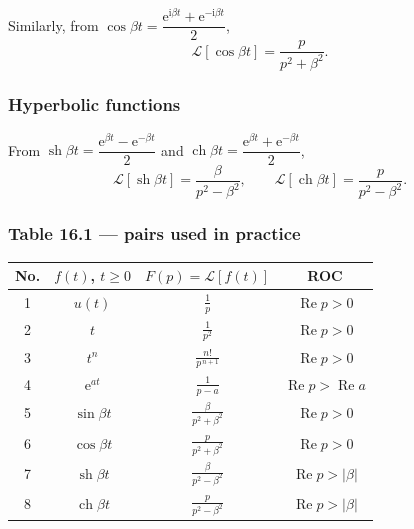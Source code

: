 \documentclass[11pt,a4paper]{article}
\theoremstyle{definition}
\theoremstyle{plain}
\begin{document}
Similarly, from
$\cos\beta t=\dfrac{\mathrm{e}^{\mathrm{i}\beta t}+\mathrm{e}^{-\mathrm{i}\beta t}}{2}$,
\begin{equation}
\mathcal{L}\left[\cos\beta t\right]=\frac{p}{p^{2}+\beta^{2}} . \tag{16.15}
\end{equation}

\subsubsection{Hyperbolic functions}

From
$\operatorname{sh}\beta t=\dfrac{\mathrm{e}^{\beta t}-\mathrm{e}^{-\beta t}}{2}$ and
$\operatorname{ch}\beta t=\dfrac{\mathrm{e}^{\beta t}+\mathrm{e}^{-\beta t}}{2}$,
\begin{equation}
\mathcal{L}\left[\operatorname{sh}\beta t\right]=\frac{\beta}{p^{2}-\beta^{2}},\qquad
\mathcal{L}\left[\operatorname{ch}\beta t\right]=\frac{p}{p^{2}-\beta^{2}} . \tag{16.16}
\end{equation}

\subsubsection{Table 16.1 --- pairs used in practice}

\begin{center}
\renewcommand{\arraystretch}{1.4}
\begin{tabular}{|c|c|c|c|}
\hline
No. & $f(t)$, $t\ge 0$ & $F(p)=\mathcal{L}[f(t)]$ & ROC \\ \hline
1 & $u(t)$ & $\frac{1}{p}$ & $\operatorname{Re}p>0$ \\ \hline
2 & $t$ & $\frac{1}{p^{2}}$ & $\operatorname{Re}p>0$ \\ \hline
3 & $t^{n}$ & $\frac{n!}{p^{\,n+1}}$ & $\operatorname{Re}p>0$ \\ \hline
4 & $\mathrm{e}^{at}$ & $\frac{1}{p-a}$ & $\operatorname{Re}p>\operatorname{Re}a$ \\ \hline
5 & $\sin\beta t$ & $\frac{\beta}{p^{2}+\beta^{2}}$ & $\operatorname{Re}p>0$ \\ \hline
6 & $\cos\beta t$ & $\frac{p}{p^{2}+\beta^{2}}$ & $\operatorname{Re}p>0$ \\ \hline
7 & $\operatorname{sh}\beta t$ & $\frac{\beta}{p^{2}-\beta^{2}}$ & $\operatorname{Re}p>|\beta|$ \\ \hline
8 & $\operatorname{ch}\beta t$ & $\frac{p}{p^{2}-\beta^{2}}$ & $\operatorname{Re}p>|\beta|$ \\ \hline
\end{tabular}
\end{center}
\end{document}
